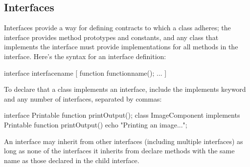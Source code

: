 \documentclass{report}
\begin{document}
\bigbreak \noindent 
\subsection{Interfaces}
\bigbreak \noindent 
Interfaces provide a way for defining contracts to which a class adheres; the interface
provides method prototypes and constants, and any class that implements the interface
must provide implementations for all methods in the interface. Here’s the syntax for
an interface definition:
\bigbreak \noindent 
\begin{phpcode}
    interface interfacename
    {
        [ function functionname();
        ...
        ]
    }
\end{phpcode}
\bigbreak \noindent 
To declare that a class implements an interface, include the implements keyword and
any number of interfaces, separated by commas:
\bigbreak \noindent 
\begin{phpcode}
    interface Printable
    {
        function printOutput();
    }
    class ImageComponent implements Printable
    {
        function printOutput()
        {
            echo "Printing an image...";
        }
    }
\end{phpcode}
\bigbreak \noindent 
An interface may inherit from other interfaces (including multiple interfaces) as long as none of the interfaces it inherits from declare methods with the same name as those declared in the child interface.

\bigbreak \noindent 
\end{document}
